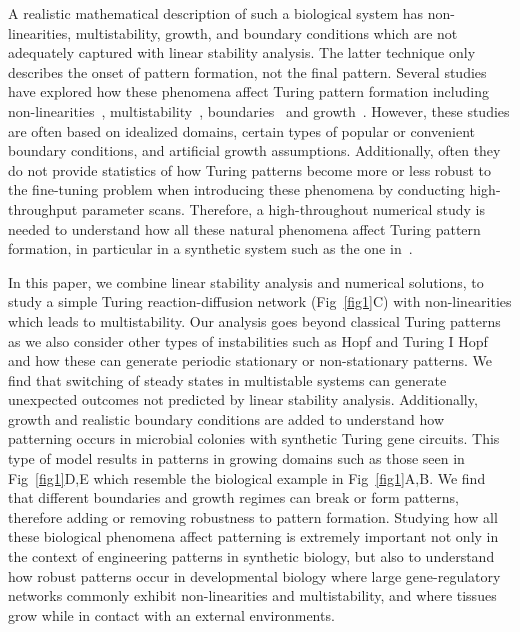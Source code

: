 \documentclass[10pt,letterpaper]{article}
\begin{document}
A realistic mathematical description of such a biological system has non-linearities, multistability, growth, and boundary conditions which are not adequately captured with linear stability analysis. The latter technique only describes the onset of pattern formation, not the final pattern.
Several studies have explored how these phenomena affect Turing pattern formation including non-linearities~\cite{ermentrout1991stripes}, multistability~\cite{Krause2023}, boundaries~\cite{Arcuri1986,Maini1993, Maini1997,Krause2020, Krause2021, Woolley2022} and growth~\cite{gaffney2010, Klika2017, Krause2019}.
However, these studies are often based on idealized domains, certain types of popular or convenient boundary conditions, and artificial growth assumptions.
Additionally, often they do not provide statistics of how Turing patterns become more or less robust to the fine-tuning problem when introducing these phenomena by conducting high-throughput parameter scans.
Therefore, a high-throughout numerical study is needed to understand how all these natural phenomena affect Turing pattern formation, in particular in a synthetic system such as the one in~\cite{Oliver2023}.

In this paper, we combine linear stability analysis and numerical solutions, to study a simple Turing reaction-diffusion network (Fig~\ref{fig1}C) with non-linearities which leads to multistability.
Our analysis goes beyond classical Turing patterns as we also consider other types of instabilities such as Hopf and Turing I Hopf and how these can generate periodic stationary or non-stationary patterns.
We find that switching of steady states in multistable systems can generate unexpected outcomes not predicted by linear stability analysis.
Additionally, growth and realistic boundary conditions are added to understand how patterning occurs in microbial colonies with synthetic Turing gene circuits. This type of model results in patterns in growing domains such as those seen in Fig~\ref{fig1}D,E which resemble the biological example in Fig~\ref{fig1}A,B. 
We find that different boundaries and growth regimes can break or form patterns, therefore adding or removing robustness to pattern formation.
Studying how all these biological phenomena affect patterning is extremely important not only in the context of engineering patterns in synthetic biology, but also to understand how robust patterns occur in developmental biology where large gene-regulatory networks commonly exhibit non-linearities and multistability, and where tissues grow while in contact with an external environments.
\end{document}
